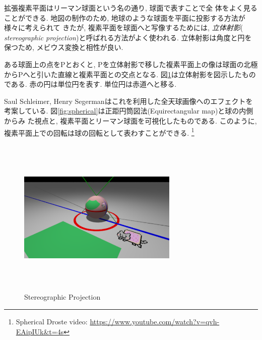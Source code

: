 拡張複素平面はリーマン球面という名の通り, 球面で表すことで全
体をよく見ることができる.
地図の制作のため, 地球のような球面を平面に投影する方法が様々に考えられて
きたが, 複素平面を球面へと写像するためには, \emph{立体射影}({\it
stereographic projection})と呼ばれる方法がよく使われる.
立体射影は角度と円を保つため, メビウス変換と相性が良い.

ある球面上の点をPとおくと, Pを立体射影で移した複素平面上の像は球面の北極
からPへと引いた直線と複素平面との交点となる.
図\ref{fig:stereoProject}は立体射影を図示したものである.
赤の円は単位円を表す. 単位円は赤道へと移る.

Saul Schleimer, Henry Segermanはこれを利用した全天球画像へのエフェクトを
考案している\cite{spherical}.
図\ref{fig:spherical}は正距円筒図法(Equirectangular map)と球の内側からみ
た視点と, 複素平面とリーマン球面を可視化したものである.
このように, 複素平面上での回転は球の回転として表わすことができる.
\footnote{Spherical Droste video: \url{https://www.youtube.com/watch?v=qvh-EAipIUk\&t=4s}}

\begin{figure}[htbp]
 \center
 \includegraphics[width=3in, height=3in, keepaspectratio]{../img/klein/stereoProject.pdf}
 \caption{Stereographic Projection}
 \label{fig:stereoProject}
\end{figure}

